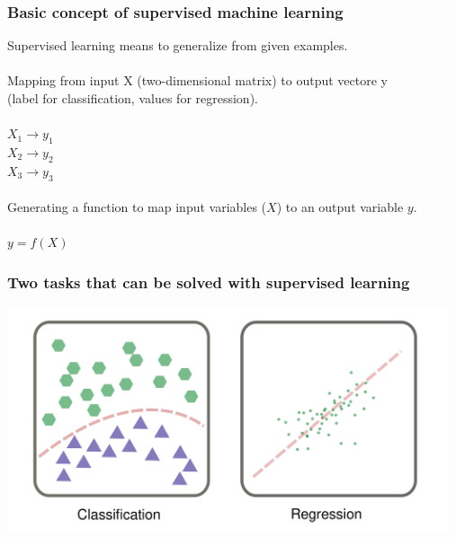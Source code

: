 \documentclass[aspectratio=169]{beamer}
\begin{document}
\begin{frame}
  \frametitle{Basic concept of supervised machine learning}

  \begin{block}{}
      \begin{center}
      Supervised learning means to generalize from given examples.\\
      \ \\
      Mapping from input X (two-dimensional matrix) to output vectore y\\
      (label for classification, values for regression).\\
      \ \\
      
      $X_{1} \rightarrow y_{1}$\\
      $X_{2} \rightarrow y_{2}$\\
      $X_{3} \rightarrow y_{3}$\\

      \ \\
      Generating a function to map input variables ($X$) to an output
      variable $y$. \\
      \ \\
      $y = f(X)$
      \end{center}
    \end{block}
\end{frame}

\begin{frame}
  \frametitle{Two tasks that can be solved with supervised learning}
  \begin{center}
    \includegraphics[width=13cm]{images/classification_and_regression.pdf}
  \end{center}
\end{frame}
\end{document}
